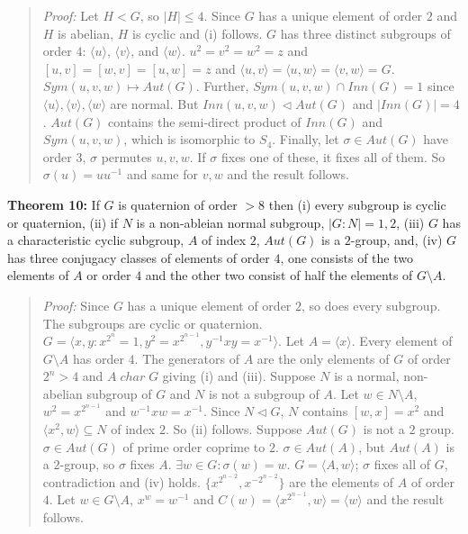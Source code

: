 \begin{quote}
\emph{Proof:}
Let $H < G$, so $|H| \leq 4$.  Since $G$ has a unique element of order $2$ and $H$ is abelian, $H$ is cyclic and
(i) follows.  $G$ has three distinct subgroups of order $4$:
$\langle u \rangle$,
$\langle v \rangle$, and
$\langle w \rangle$. $u^2=v^2=w^2 =z$ and $[u,v] = [w,v] = [u,w] =z$ and
$\langle u, v \rangle = 
\langle u, w \rangle = 
\langle v, w \rangle = G$.  $Sym(u,v,w) \mapsto Aut(G)$.  Further, $Sym(u,v,w) \cap Inn(G) = 1$ since
$\langle u \rangle, \langle v \rangle, \langle w \rangle$ are normal.  But $Inn(u,v,w) \lhd Aut(G)$ and
$|Inn(G)| = 4$.  $Aut(G)$ contains the semi-direct product of $Inn(G)$ and $Sym(u, v, w)$, which is
isomorphic to $S_4$.  Finally, let  $\sigma \in Aut(G)$ have order $3$, $\sigma$ permutes $u,v,w$.
If $\sigma$ fixes one of these, it fixes all of them.  So $\sigma(u)= u u^{-1}$ and same for $v, w$
and the result follows.
\end{quote}
{\bf Theorem 10:} If $G$ is quaternion of order $>8$ then (i) every subgroup is cyclic or quaternion,
(ii) if $N$ is a non-ableian normal subgroup, $|G:N| = 1, 2$,
(iii) $G$ has a characteristic cyclic subgroup, $A$ of index $2$,
$Aut(G)$ is a $2$-group, and,
(iv) $G$ has three conjugacy classes of elements of order $4$, one consists of the two elements of $A$ or order $4$
and the other two consist of half the elements of $G \setminus A$.
\begin{quote}
\emph{Proof:}
Since $G$ has a unique element of order $2$, so does every subgroup.
The subgroups are cyclic or quaternion.
$G = \langle x, y: x^{2^n}= 1, y^2= x^{2^{n-1}}, y^{-1} x y = x^{-1} \rangle$.  Let $A = \langle x \rangle$.
Every element of $G \setminus A$ has order $4$.  The generators of $A$ are the only elements of $G$
of order $2^n > 4$ and $A \; char \; G$ giving (i) and (iii).  Suppose $N$ is a normal, non-abelian subgroup
of $G$ and $N$ is not a subgroup of $A$.  Let $w \in N \setminus A$, $w^2 = x^{2^{n-1}}$ and
$w^{-1} x w = x^{-1}$.  Since $N \lhd G$, $N$ contains $[w,x]=x^2$ and $\langle x^2, w \rangle \subseteq N$
of index $2$.  So (ii) follows.
Suppose $Aut(G)$ is not a $2$ group. $\sigma \in Aut(G)$ of prime order coprime to $2$. $\sigma \in Aut(A)$,
but $Aut(A)$ is a $2$-group, so $\sigma$ fixes $A$.  $\exists w \in G: \sigma(w) =w$.
$G = \langle A, w \rangle$; $\sigma$ fixes all of $G$, contradiction and (iv) holds.
$\{ x^{2^{n-2}},x^{-2^{n-2}} \} $ are the elements of $A$ of order $4$.  Let $w \in G \setminus A$,
$x^w = w^{-1}$ and $C(w)= \langle x^{2^{n-1}}, w \rangle = \langle w \rangle$ and the result follows.
\end{quote}
